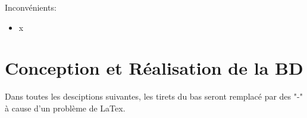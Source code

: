 \documentclass[
    iai, %
    il, %
]{heig-tb}
\begin{document}
Inconvénients:
\begin{itemize}
    \item x
\end{itemize}





\chapter{Conception et Réalisation de la BD}


Dans toutes les desciptions suivantes, les tirets du bas seront remplacé par des "-" à cause d'un problème de LaTex.
\end{document}
